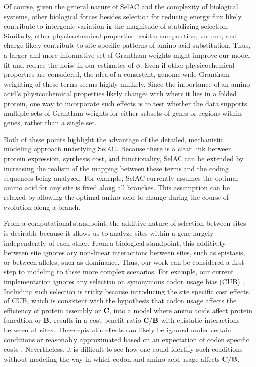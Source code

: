 \documentclass[12pt,letterpaper]{article}
\newcommand{\Cost}{\ensuremath{\text{\textbf{C}}}\xspace}
\newcommand{\Func}{\ensuremath{\text{\textbf{B}}}\xspace}
\newcommand{\selac}{SelAC\xspace}
\begin{document}
Of course, given the general nature of \selac and the complexity of biological systems, other biological forces besides selection for reducing energy flux likely contribute to intergenic variation in the magnitude of stabilizing selection.
Similarly, other physicochemical properties besides composition, volume, and charge likely contribute to site specific patterns of amino acid substitution.
Thus, a larger and more informative set of Grantham weights might improve our model fit and reduce the noise in our estimates of $\phi$.
Even if other physicochemical properties are considered, the idea of a consistent, genome wide Grantham weighting of these terms seems highly unlikely.
Since the importance of an amino acid's physicochemical properties likely changes with where it lies in a folded protein, one way to incorporate such effects is to test whether the data supports multiple sets of Grantham weights for either subsets of genes or regions within genes, rather than a single set.


Both of these points highlight the advantage of the detailed, mechanistic modeling approach underlying \selac.
Because there is a clear link between protein expression, synthesis cost, and functionality, \selac can be extended by increasing the realism of the mapping between these terms and the coding sequences being analyzed.
For example, \selac currently assumes the optimal amino acid for any site is fixed along all branches.
This assumption can be relaxed by allowing the optimal amino acid to change during the course of evolution along a branch.

From a computational standpoint, the additive nature of selection between sites is desirable because it allows us to analyze sites within a gene largely independently of each other.
From a biological standpoint, this additivity between site ignores any non-linear interactions between sites, such as epistasis, or between alleles, such as dominance.
Thus, our work can be considered a first step to modeling to these more complex scenarios.
For example, our current implementation ignores any selection on synonymous codon usage bias (CUB) \citep[c.f.~][]{YangAndNielsen2008,PouyetEtAl2016}.
Including such selection is tricky because introducing the site specific cost effects of CUB, which is consistent with the hypothesis that codon usage affects the efficiency of protein assembly or \Cost, into a model where amino acids affect protein funcdtion or \Func, results in a cost-benefit ratio $\Cost/\Func$ with epistatic interactions between all sites.
These epistatic effects can likely be ignored under certain conditions or reasonably approximated based on an expectation of codon specific costs \citep[e.g.~][]{KubatkoEtAl2016}.
Nevertheless, it is difficult to see how one could identify such conditions without modeling the way in which codon and amino acid usage affects $\Cost/\Func$.
\end{document}
